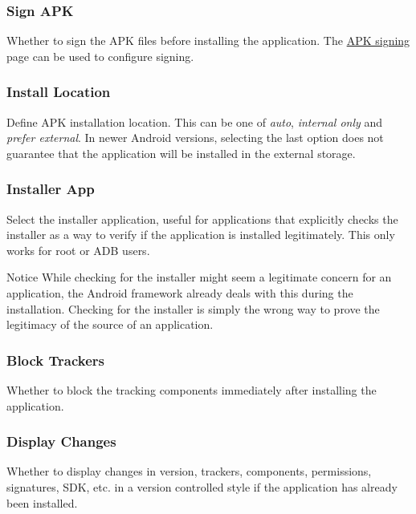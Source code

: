 \subsubsection{Sign APK} %
Whether to sign the APK files before installing the application. The \hyperref[subsec:apk-signing]{APK signing} page can
be used to configure signing.

\subsubsection{Install Location} %
Define APK installation location. This can be one of \textit{auto}, \textit{internal only} and \textit{prefer external}.
In newer Android versions, selecting the last option does not guarantee that the application will be installed in the external storage.

\subsubsection{Installer App} %
Select the installer application, useful for applications that explicitly checks the installer as a way to verify if the application is installed legitimately.
This only works for root or ADB users.

\begin{tip}{Notice}
    While checking for the installer might seem a legitimate concern for an application, the Android framework already deals with this during the installation.
    Checking for the installer is simply the wrong way to prove the legitimacy of the source of an application.
\end{tip}

\subsubsection{Block Trackers} %
Whether to block the tracking components immediately after installing the application.

\subsubsection{Display Changes} %
Whether to display changes in version, trackers, components, permissions, signatures, SDK, etc. in a version controlled style if the application has already been installed.


